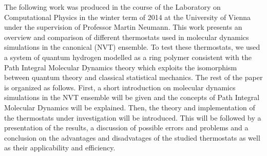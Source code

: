 The following work was produced in the course of the Laboratory on Computational Physics in the winter term of 2014 at the University of Vienna under the supervision of Professor Martin Neumann. This work presents an overview and comparison of different thermostats used in molecular dynamics simulations in the canonical (NVT) ensemble. To test these thermostats, we used a system of quantum hydrogen modelled as a ring polymer consistent with the Path Integral Molecular Dynamics theory which exploits the isomorphism between quantum theory and classical statistical mechanics.
The rest of the paper is organized as follows. First, a short introduction on molecular dynamics simulations in the NVT ensemble will be given and the concepts of Path Integral Molecular Dynamics will be explained. Then, the theory and implementation of the thermostats under investigation will be introduced. This will be followed by a presentation of the results, a discussion of possible errors and problems and a conclusion on the advantages and disadvatages of the studied thermostats as well as their applicability and efficiency. 
